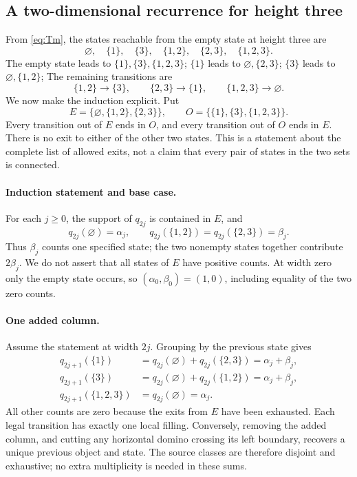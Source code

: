 \subsection{A two-dimensional recurrence for height three}
From \eqref{eq:Tm}, the states reachable from the empty state
at height three are
\[
\varnothing,\quad\{1\},\quad\{3\},\quad\{1,2\},\quad\{2,3\},\quad\{1,2,3\}.
\]
The empty state leads to $\{1\},\{3\},\{1,2,3\}$;
$\{1\}$ leads to $\varnothing,\{2,3\}$;
$\{3\}$ leads to $\varnothing,\{1,2\}$;
The remaining transitions are
\[
\{1,2\}\longrightarrow\{3\},\qquad
\{2,3\}\longrightarrow\{1\},\qquad
\{1,2,3\}\longrightarrow\varnothing.
\]
We now make the induction explicit. Put
\[
 E=\{\varnothing,\{1,2\},\{2,3\}\},\qquad
 O=\{\{1\},\{3\},\{1,2,3\}\}.
\]
Every transition out of $E$ ends in $O$, and every transition out of
$O$ ends in $E$. There is no exit to either of the other two states.
This is a statement about the complete list of allowed exits, not a
claim that every pair of states in the two sets is connected.

\paragraph{Induction statement and base case.}
For each $j\ge0$, the support of $q_{2j}$ is contained in $E$, and
\[
 q_{2j}(\varnothing)=\alpha_j,\qquad
 q_{2j}(\{1,2\})=q_{2j}(\{2,3\})=\beta_j.
\]
Thus $\beta_j$ counts one specified state; the two nonempty states
together contribute $2\beta_j$. We do not assert that all states of
$E$ have positive counts. At width zero only the empty state occurs,
so $(\alpha_0,\beta_0)=(1,0)$, including equality of the two zero counts.

\paragraph{One added column.}
Assume the statement at width $2j$. Grouping by the previous state gives
\[
\begin{aligned}
q_{2j+1}(\{1\})
 &=q_{2j}(\varnothing)+q_{2j}(\{2,3\})=\alpha_j+\beta_j,\\
q_{2j+1}(\{3\})
 &=q_{2j}(\varnothing)+q_{2j}(\{1,2\})=\alpha_j+\beta_j,\\
q_{2j+1}(\{1,2,3\})&=q_{2j}(\varnothing)=\alpha_j.
\end{aligned}
\]
All other counts are zero because the exits from $E$ have been exhausted.
Each legal transition has exactly one local filling. Conversely,
removing the added column, and cutting any horizontal domino crossing
its left boundary, recovers a unique previous object and state.
The source classes are therefore disjoint and exhaustive; no extra
multiplicity is needed in these sums.

